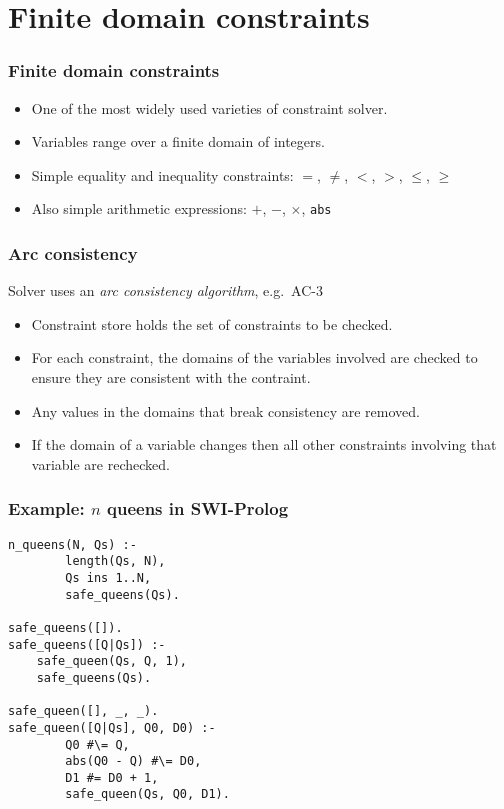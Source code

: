 \documentclass[aspectratio=169,hyphens]{beamer} %
\begin{document}
\section{Finite domain constraints}

\begin{frame}[fragile]
    \frametitle{Finite domain constraints}
\begin{itemize}
    \item One of the most widely used varieties of constraint solver.
        \pause
    \item Variables range over a finite domain of integers.
        \pause
    \item Simple equality and inequality constraints: $=$, $\neq$, $<$, $>$, $\leq$, $\geq$
        \pause
    \item Also simple arithmetic expressions: $+$, $-$, $\times$, \texttt{abs}
\end{itemize}
\end{frame}

\begin{frame}[fragile]
    \frametitle{Arc consistency}
Solver uses an \emph{arc consistency algorithm}, e.g.\ AC-3
\begin{itemize}
    \item Constraint store holds the set of constraints to be checked.
        \pause
    \item For each constraint, the domains of the variables involved are checked to
        ensure they are consistent with the contraint.
        \pause
    \item Any values in the domains that break consistency are removed.
        \pause
    \item If the domain of a variable changes then all other constraints involving that variable are
        rechecked.
\end{itemize}
\end{frame}

\begin{frame}[fragile]
    \frametitle{Example: $n$ queens in SWI-Prolog}

\begin{verbatim}
n_queens(N, Qs) :-
        length(Qs, N),
        Qs ins 1..N,
        safe_queens(Qs).

safe_queens([]).
safe_queens([Q|Qs]) :-
    safe_queen(Qs, Q, 1),
    safe_queens(Qs).

safe_queen([], _, _).
safe_queen([Q|Qs], Q0, D0) :-
        Q0 #\= Q,
        abs(Q0 - Q) #\= D0,
        D1 #= D0 + 1,
        safe_queen(Qs, Q0, D1).
\end{verbatim}
\end{frame}
\end{document}
